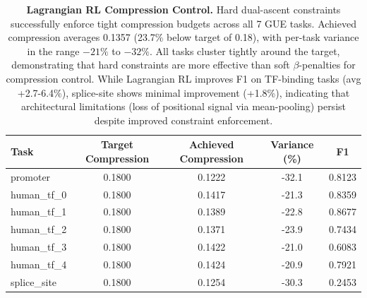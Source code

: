 \documentclass[sigconf,screen]{acmart}
\begin{document}
\begin{table}[!ht]
\centering
\small
\begin{tabular}{lcccc}
\toprule
\textbf{Task} & \textbf{Target Compression} & \textbf{Achieved Compression} & \textbf{Variance (\%)} & \textbf{F1} \\
\midrule
promoter & 0.1800 & 0.1222 & -32.1 & 0.8123 \\
human\_tf\_0 & 0.1800 & 0.1417 & -21.3 & 0.8359 \\
human\_tf\_1 & 0.1800 & 0.1389 & -22.8 & 0.8677 \\
human\_tf\_2 & 0.1800 & 0.1371 & -23.9 & 0.7434 \\
human\_tf\_3 & 0.1800 & 0.1422 & -21.0 & 0.6083 \\
human\_tf\_4 & 0.1800 & 0.1424 & -20.9 & 0.7921 \\
splice\_site & 0.1800 & 0.1254 & -30.3 & 0.2453 \\
\bottomrule
\end{tabular}
\caption{\textbf{Lagrangian RL Compression Control.} Hard dual-ascent constraints successfully enforce tight compression budgets across all 7 GUE tasks. Achieved compression averages 0.1357 (23.7\% below target of 0.18), with per-task variance in the range $-21\%$ to $-32\%$. All tasks cluster tightly around the target, demonstrating that hard constraints are more effective than soft $\beta$-penalties for compression control. While Lagrangian RL improves F1 on TF-binding tasks (avg +2.7-6.4\%), splice-site shows minimal improvement (+1.8\%), indicating that architectural limitations (loss of positional signal via mean-pooling) persist despite improved constraint enforcement.}
\label{tab:lagrangian_compression}
\end{table}%
\end{document}
